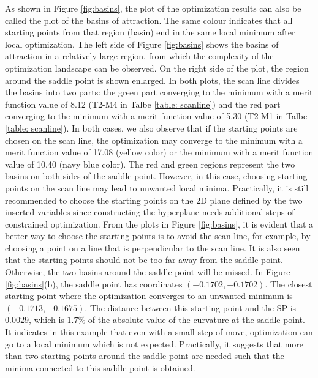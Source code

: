 As shown in Figure \ref{fig:basins}, the plot of the optimization results can also be called the plot of the basins of attraction. The same colour indicates that all starting points from that region (basin) end in the same local minimum after local optimization. The left side of Figure \ref{fig:basins} shows the basins of attraction in a relatively large region, from which the complexity of the optimization landscape can be observed. On the right side of the plot, the region around the saddle point is shown enlarged. In both plots, the scan line divides the basins into two parts: the green part converging to the minimum with a merit function value of 8.12 (T2-M4 in Talbe \ref{table: scanline}) and the red part converging to the minimum with a merit function value of 5.30 (T2-M1 in Talbe \ref{table: scanline}). In both cases, we also observe that if the starting points are chosen on the scan line, the optimization may converge to the minimum with a merit function value of 17.08 (yellow color) or the minimum with a merit function value of 10.40 (navy blue color). The red and green regions represent the two basins on both sides of the saddle point. However, in this case, choosing starting points on the scan line may lead to unwanted local minima. Practically, it is still recommended to choose the starting points on the 2D plane defined by the two inserted variables since constructing the hyperplane needs additional steps of constrained optimization. From the plots in Figure \ref{fig:basins}, it is evident that a better way to choose the starting points is to avoid the scan line, for example, by choosing a point on a line that is perpendicular to the scan line. It is also seen that the starting points should not be too far away from the saddle point. Otherwise, the two basins around the saddle point will be missed. In Figure \ref{fig:basins}(b), the saddle point has coordinates $(-0.1702,-0.1702)$. The closest starting point where the optimization converges to an unwanted minimum is $(-0.1713, -0.1675)$. The distance between this starting point and the SP is $0.0029$, which is $1.7\%$ of the absolute value of the curvature at the saddle point. It indicates in this example that even with a small step of move, optimization can go to a local minimum which is not expected. Practically, it suggests that more than two starting points around the saddle point are needed such that the minima connected to this saddle point is obtained. 

